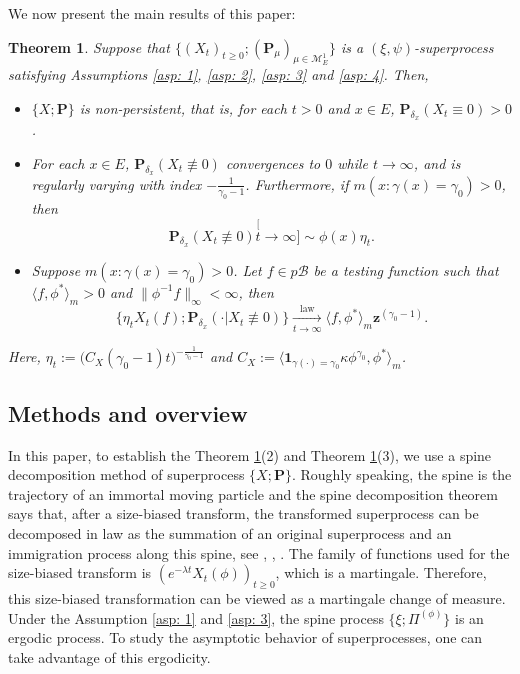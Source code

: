 \documentclass[12pt, a4paper]{amsart}
\newtheorem{thm}{Theorem}[section]
\theoremstyle{definition}
\numberwithin{equation}{section}
\begin{document}
	We now present the main results of this paper: 

\begin{thm}
\label{thm: main theorem}
	Suppose that $\{(X_t)_{t\geq 0}; (\mathbf P_\mu)_{\mu \in \mathcal M_E^1}\}$ is a $(\xi, \psi)$-superprocess satisfying Assumptions \ref{asp: 1}, \ref{asp: 2}, \ref{asp: 3} and \ref{asp: 4}. Then,
\begin{itemize}
	\item[(1)] $\{X; \mathbf P\}$ is non-persistent, that is, for each $t > 0$ and $x\in E$, $\mathbf P_{\delta_x}(X_t \equiv 0) > 0$. 
	\item[(2)] For each $x\in E$, $\mathbf P_{\delta_x}(X_t \not \equiv 0)$ convergences to $0$ while $t\to \infty$, and is regularly varying with index $-\frac{1}{\gamma_0-1}$. 
	Furthermore, if $m(x: \gamma (x)= \gamma_0)>0$, then 
\[
	\mathbf P_{\delta_x}(X_t \not \equiv 0)
	\stackrel[t\to \infty]{}{\sim} \phi(x)\eta_t.
\]
	\item[(3)] Suppose $m( x:\gamma(x)=\gamma_0 )>0$. 
	Let $f \in p\mathscr B$ be a testing function such that $\langle f, \phi^* \rangle_m > 0$  and $\| \phi^{-1}f \|_\infty < \infty$, then
\[
	\{   \eta_t X_t(f) ; \mathbf P_{\delta_x}(\cdot | X_t \not \equiv 0) \}
	\xrightarrow[t\to \infty]{\operatorname{law}} 
	\langle f, \phi^*\rangle_m \mathbf z^{(\gamma_0 - 1)}.
\]  
\end{itemize}
	Here, $\eta_t := \big( C_X(\gamma_0 - 1) t \big)^{- \frac {1} {\gamma_0 - 1} }$ and $C_X := \langle \mathbf 1_{\gamma(\cdot) = \gamma_0} \kappa \phi^{\gamma_0}, \phi^* \rangle_m$.
\end{thm}

\subsection{Methods and overview}
	
	In this paper, to establish the Theorem \ref{thm: main theorem}(2) and Theorem \ref{thm: main theorem}(3), we use a spine decomposition method of superprocess $\{X; \mathbf P\}$.
	Roughly speaking, the spine is the trajectory of an immortal moving particle and the spine decomposition theorem says that, after a size-biased transform, the transformed superprocess can be decomposed in law as the summation of an original superprocess and an immigration process along this spine, see \cite{EckhoffKyprianouWinkel2015Spines}, \cite{EnglanderKyprianou2004Local}, \cite{LiuRenSong2009Llog}.
	The family of functions used for the size-biased transform is $(e^{-\lambda t} X_t(\phi))_{t\geq 0}$, which is a martingale. 
	Therefore, this size-biased transformation can be viewed as a martingale change of measure. 
	Under the Assumption \ref{asp: 1} and \ref{asp: 3}, the spine process $\{\xi; \Pi^{(\phi)}\}$ is an ergodic process. 
	To study the asymptotic behavior of superprocesses, one can take advantage of this ergodicity. 
	
\end{document}
